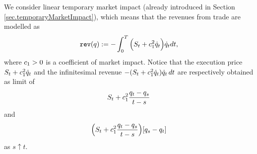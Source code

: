 \documentclass[10pt,a4paper]{article}
\begin{document}
	We consider linear temporary market impact (already introduced in Section \ref{sec.temporaryMarketImpact}), which means that the revenues from trade are modelled as 
	\begin{equation}\label{eq.revenuesFromTrade}
	\mathtt{rev}(q) := -\int_{0}^{T} \Big(
	S_t+ c_{1}^{2} \dot{q}_t
	\Big)\dot{q}_t dt,
	\end{equation}
	where $c_{1}>0$ is a coefficient of market impact. Notice that the execution price $S_t + c_{1}^{2} \dot{q}_{t}$ and the infinitesimal revenue $-(
	S_t+ c_{1}^{2} \dot{q}_t)\dot{q}_t \, dt $ are respectively obtained as limit of 
	\[
	S_t+ c_{1}^{2} \frac{q_t- q_s}{t-s}
	\]
	and
	\[
	\Big(
	S_t+ c_{1}^{2} \frac{q_t- q_s}{t-s}
	\Big)[q_s - q_t]
	\]
	as $s\uparrow t$.
	
\end{document}
